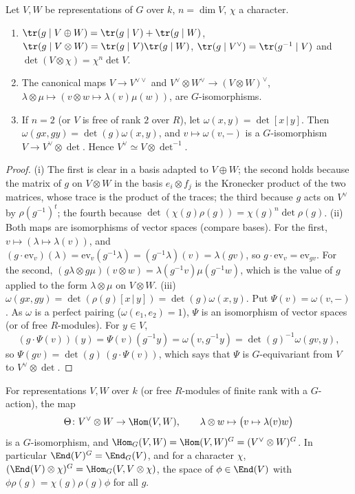 \begin{proposition}\label{prop:reps:basic-facts}
Let $V,W$ be representations of $G$ over $k$, $n=\dim V$, $\chi$ a character.
\begin{enumerate}[label=(\roman*)]
\item $\tr(g\mid V\oplus W)=\tr(g\mid V)+\tr(g\mid W)$, $\tr(g\mid V\otimes W)=\tr(g\mid V)\tr(g\mid W)$, $\tr(g\mid V^\vee)=\tr(g^{-1}\mid V)$ and
$\det(V\otimes\chi)=\chi^n\det V$.
\item The canonical maps $V\to V^{\vee\vee}$ and $V^\vee\otimes W^\vee\to(V\otimes W)^\vee$, $\lambda\otimes\mu\mapsto(v\otimes w\mapsto\lambda(v)\mu(w))$, are
$G$-isomorphisms.
\item If $n=2$ (or $V$ is free of rank $2$ over $R$), let $\omega(x,y)=\det[x\,|\,y]$. Then $\omega(gx,gy)=\det(g)\omega(x,y)$, and
$v\mapsto\omega(v,{-})$ is a $G$-isomorphism $V\to V^\vee\otimes\det$. Hence $V^\vee\simeq V\otimes\det^{-1}$.
\end{enumerate}
\end{proposition}

\begin{proof}
(i) The first is clear in a basis adapted to $V\oplus W$; the second holds because the matrix of $g$ on $V\otimes W$ in the basis
$e_i\otimes f_j$ is the Kronecker product of the two matrices, whose trace is the product of the traces; the third because $g$ acts on
$V^\vee$ by $\rho(g^{-1})^t$; the fourth because $\det(\chi(g)\rho(g))=\chi(g)^n\det\rho(g)$.
(ii) Both maps are isomorphisms of vector spaces (compare bases). For the first, $v\mapsto(\lambda\mapsto\lambda(v))$, and
$(g\cdot\mathrm{ev}_v)(\lambda)=\mathrm{ev}_v(g^{-1}\lambda)=(g^{-1}\lambda)(v)=\lambda(gv)$, so $g\cdot\mathrm{ev}_v=\mathrm{ev}_{gv}$. For the second,
$(g\lambda\otimes g\mu)(v\otimes w)=\lambda(g^{-1}v)\mu(g^{-1}w)$, which is the value of $g$ applied to the form $\lambda\otimes\mu$ on $V\otimes W$.
(iii) $\omega(gx,gy)=\det(\rho(g)[x\,|\,y])=\det(g)\omega(x,y)$. Put $\Psi(v)=\omega(v,{-})$. As $\omega$ is a perfect pairing ($\omega(e_1,e_2)=1$),
$\Psi$ is an isomorphism of vector spaces (or of free $R$-modules). For $y\in V$,
\[
(g\cdot\Psi(v))(y)=\Psi(v)(g^{-1}y)=\omega(v,g^{-1}y)=\det(g)^{-1}\omega(gv,y),
\]
so $\Psi(gv)=\det(g)\,(g\cdot\Psi(v))$, which says that $\Psi$ is $G$-equivariant from $V$ to $V^\vee\otimes\det$.
\end{proof}

\begin{proposition}\label{prop:reps:homG}
For representations $V,W$ over $k$ (or free $R$-modules of finite rank with a $G$-action), the map
\[
\Theta\colon V^\vee\otimes W\to\Hom(V,W),\qquad \lambda\otimes w\mapsto\bigl(v\mapsto\lambda(v)w\bigr)
\]
is a $G$-isomorphism, and $\Hom_G(V,W)=\Hom(V,W)^G=(V^\vee\otimes W)^G$. In particular $\End(V)^G=\End_G(V)$, and for a character $\chi$,
$(\End(V)\otimes\chi)^G=\Hom_G(V,V\otimes\chi)$, the space of $\phi\in\End(V)$ with $\phi\rho(g)=\chi(g)\rho(g)\phi$ for all $g$.
\end{proposition}

